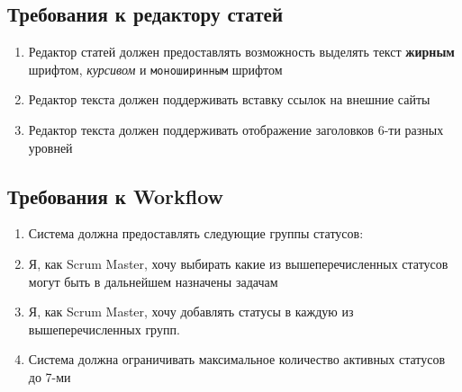 \documentclass[14pt,a4paper]{extarticle}
\begin{document}
\subsection{Требования к редактору статей}
\begin{enumerate}[label=\textbf{AER\arabic*}.]
	\item Редактор статей должен предоставлять возможность выделять текст
	      \textbf{жирным} шрифтом, \textit{курсивом} и \texttt{моноширинным} шрифтом
	\item Редактор текста должен поддерживать вставку ссылок на внешние сайты
	\item Редактор текста должен поддерживать отображение заголовков 6-ти разных
	      уровней
\end{enumerate}

\subsection{Требования к Workflow}
\begin{enumerate}[label=\textbf{WFR\arabic*}.]
	\item Система должна предоставлять следующие группы статусов:
	\item Я, как Scrum Master, хочу выбирать какие из вышеперечисленных статусов могут быть в дальнейшем назначены задачам
	\item Я, как Scrum Master, хочу добавлять статусы в каждую из вышеперечисленных групп.
	\item Система должна ограничивать максимальное количество активных статусов до 7-ми
\end{enumerate}
\end{document}
